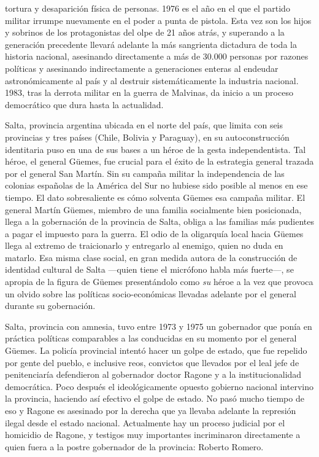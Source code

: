 tortura y desaparición física de personas. 1976 es el año en el que el partido militar irrumpe nuevamente en el poder a punta de pistola. Esta vez son los hijos y sobrinos de los protagonistas del  olpe de 21 años atrás, y superando a la generación precedente llevará adelante la más sangrienta dictadura de toda la historia nacional, asesinando directamente a más de 30.000 personas por razones políticas y asesinando indirectamente a generaciones enteras al endeudar astronómicamente al país y al destruir sistemáticamente la industria nacional. 1983, tras la derrota militar en la guerra de Malvinas, da inicio a un proceso democrático que dura hasta la actualidad.

Salta, provincia argentina ubicada en el norte del país, que limita con seis provincias y tres países (Chile, Bolivia y Paraguay), en su autoconstrucción identitaria puso en una de sus bases a un héroe de la gesta independentista. Tal héroe, el general Güemes, fue crucial para el éxito de la estrategia general trazada por el general San Martín. Sin su campaña militar la independencia de las colonias españolas de la América del Sur no hubiese sido posible al menos en ese tiempo. El dato sobresaliente es cómo solventa Güemes esa campaña militar. El general Martín Güemes, miembro de una familia socialmente bien posicionada, llega a la gobernación de la provincia de Salta,   obliga a las familias más pudientes a pagar el impuesto para la guerra. El odio de la oligarquía local hacia Güemes llega al extremo de traicionarlo y entregarlo al enemigo, quien no duda en matarlo. Esa misma clase social, en gran medida autora de la construcción de identidad cultural de Salta ---quien tiene el micrófono habla más fuerte---, se apropia de la figura de Güemes presentándolo como \emph{su} héroe a la vez que provoca un olvido sobre las políticas socio-económicas llevadas adelante por el general durante su gobernación.

Salta, provincia con amnesia, tuvo entre 1973 y 1975 un gobernador que ponía en práctica políticas comparables a las conducidas en su momento por el general Güemes. La policía provincial intentó hacer un golpe de estado, que fue repelido por gente del pueblo, e inclusive reos, convictos que llevados por el leal jefe de penitenciaría defendieron al gobernador doctor Ragone y a la institucionalidad democrática. Poco después el ideológicamente opuesto gobierno nacional intervino la provincia, haciendo así efectivo el golpe de estado. No pasó mucho tiempo de eso y Ragone es asesinado por la derecha que ya llevaba adelante la represión ilegal desde el estado nacional. Actualmente hay un proceso judicial por el homicidio de Ragone, y testigos muy importantes incriminaron directamente a quien fuera a la postre gobernador de la provincia: Roberto Romero.

